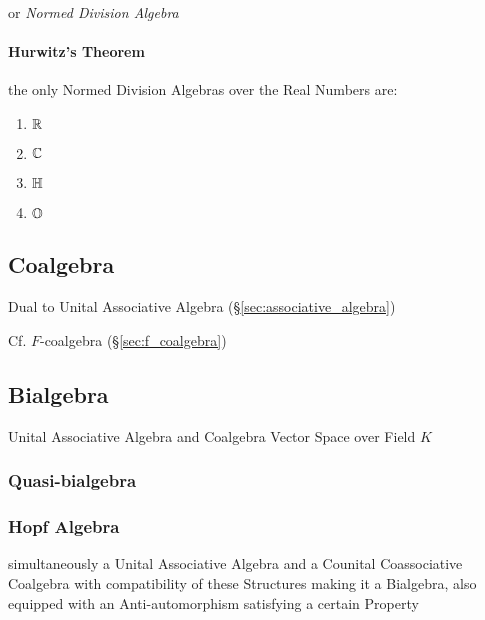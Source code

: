 or \emph{Normed Division Algebra}



\paragraph{Hurwitz's Theorem}\label{sec:hurwitzs_theorem}\hfill

the only Normed Division Algebras over the Real Numbers are:
\begin{enumerate}
  \item $\mathbb{R}$
  \item $\mathbb{C}$
  \item $\mathbb{H}$
  \item $\mathbb{O}$
\end{enumerate}



\subsection{Coalgebra}\label{sec:coalgebra}

Dual to Unital Associative Algebra (\S\ref{sec:associative_algebra})

Cf. $F$-coalgebra (\S\ref{sec:f_coalgebra})



\subsection{Bialgebra}\label{sec:bialgebra}

Unital Associative Algebra and Coalgebra Vector Space over Field $K$



\subsubsection{Quasi-bialgebra}\label{sec:quasi_bialgebra}

\subsubsection{Hopf Algebra}\label{sec:hopf_algebra}

simultaneously a Unital Associative Algebra and a Counital
Coassociative Coalgebra with compatibility of these Structures making
it a Bialgebra, also equipped with an Anti-automorphism satisfying a
certain Property %

